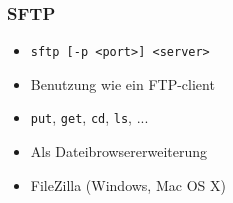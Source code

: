 \begin{frame}
\frametitle{SFTP}
\begin{itemize}
\item \texttt{sftp [-p <port>] <server>} 
\pause
\item Benutzung wie ein FTP-client
\pause
\item \texttt{put}, \texttt{get}, \texttt{cd}, \texttt{ls}, ...
\pause
\item Als Dateibrowsererweiterung
\pause
\item FileZilla (Windows, Mac OS X)
\end{itemize}
\end{frame}